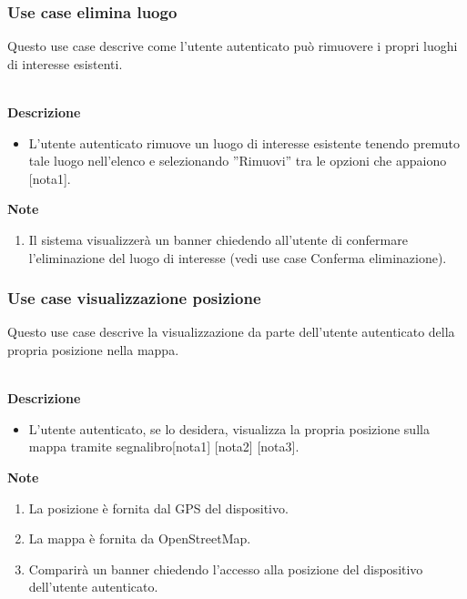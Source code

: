 \documentclass[a4paper,12pt]{article}
\begin{document}
\subsubsection*{Use case elimina luogo}

Questo use case descrive come l'utente autenticato può  rimuovere  i propri luoghi di interesse esistenti.

\textbf{\\Descrizione}
\begin{itemize} \setlength\itemsep{0.01em}
\item L'utente autenticato rimuove un luogo di interesse esistente tenendo premuto tale luogo nell'elenco e selezionando ''Rimuovi'' tra le opzioni che appaiono [nota1].
\end{itemize}

\textbf{Note}
\begin{enumerate} \setlength\itemsep{0.01em}
\item Il sistema visualizzerà un banner chiedendo all'utente di confermare l'eliminazione del luogo di interesse  (vedi use case Conferma eliminazione).
\end{enumerate}



\subsubsection*{Use case visualizzazione posizione}

Questo use case descrive la visualizzazione da parte dell'utente autenticato della propria posizione nella mappa.

\textbf{\\Descrizione}
\begin{itemize} \setlength\itemsep{0.01em}
\item L'utente autenticato, se lo desidera, visualizza la propria posizione sulla mappa tramite segnalibro[nota1] [nota2] [nota3].
\end{itemize}

\textbf{Note}
\begin{enumerate} \setlength\itemsep{0.01em}
\item La posizione è fornita dal GPS del dispositivo.
\item La mappa è fornita da OpenStreetMap.
\item Comparirà un banner chiedendo l'accesso alla posizione del dispositivo dell'utente autenticato.
\end{enumerate}
\end{document}
